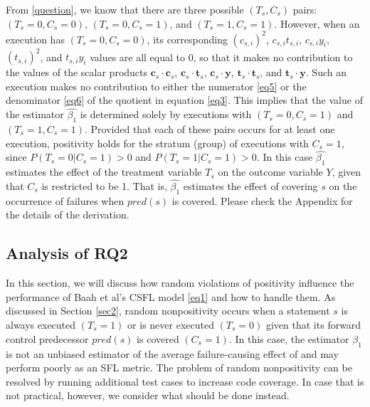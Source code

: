 From \ref{question}, we know that there are three possible $(T_s,C_s)$ pairs:
$(T_s=0,C_s=0)$, $(T_s=0,C_s=1)$, and $(T_s=1,C_s=1)$.  
However, when an execution has $(T_s=0,C_s=0)$, its corresponding $(c_{s,i})^2$, 
$c_{s,i}t_{s,i}$, $c_{s,i}y_i$, $(t_{s,i})^2$, and $t_{s,i}y_i$ values are all equal to 0, 
so that it makes no contribution to the values of the scalar products $\mathbf{c}_s\cdot\mathbf{c}_s$,
$\mathbf{c}_s\cdot\mathbf{t}_s$, $\mathbf{c}_s\cdot\mathbf{y}$, $\mathbf{t}_s\cdot\mathbf{t}_s$, 
and $\mathbf{t}_s\cdot\mathbf{y}$.  Such an execution makes no contribution to either the numerator \eqref{eq5} or the denominator \eqref{eq6} of the quotient in equation \eqref{eq3}.  
This implies that the value of the estimator $\hat{\beta_1}$ is determined solely by executions with
$(T_s=0,C_s=1)$ and $(T_s=1,C_s=1)$.  Provided that each of these pairs occurs for at least one execution, 
positivity holds for the stratum (group) of executions with $C_s=1$, since 
$P(T_s=0|C_s=1)>0$ and $P(T_s=1|C_s=1)>0$.  In this case $\hat{\beta_1}$ estimates the effect of the 
treatment variable $T_s$ on the outcome variable $Y$, given that $C_s$ is restricted to be 1.  
That is, $\hat{\beta_1}$ estimates the effect of covering $s$ on the occurrence of failures 
when $pred(s)$ is covered. Please check the Appendix for the details of the derivation.


\subsection{Analysis of RQ2}\label{sec3.2}

In this section, we will discuss how random violations of positivity influence the performance of 
Baah et al’s CSFL model \eqref{eq1} and how to handle them.  As discussed in Section \ref{sec2}, 
random nonpositivity occurs when a statement $s$ is always executed $(T_s=1)$ or is never 
executed $(T_s=0)$ given that its forward control predecessor $pred(s)$ is covered $(C_s=1)$.  
In this case, the estimator $\hat{\beta_1}$ is not an unbiased estimator of the average 
failure-causing effect of  and may perform poorly as an SFL metric.  
The problem of random nonpositivity can be resolved by running additional test cases to increase code coverage.   
In case that is not practical, however, we consider what should be done instead.

